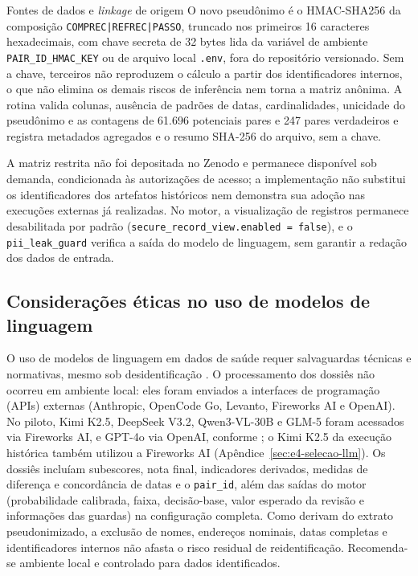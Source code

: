 \begin{chapter}{Fontes de dados e \textit{linkage} de origem}
O novo pseudônimo é o HMAC-SHA256 da composição \texttt{COMPREC|\allowbreak REFREC|\allowbreak PASSO}, truncado nos primeiros 16 caracteres hexadecimais, com chave secreta de 32 bytes lida da variável de ambiente \texttt{PAIR\_\allowbreak ID\_\allowbreak HMAC\_\allowbreak KEY} ou de arquivo local \texttt{.env}, fora do repositório versionado. Sem a chave, terceiros não reproduzem o cálculo a partir dos identificadores internos, o que não elimina os demais riscos de inferência nem torna a matriz anônima. A rotina valida colunas, ausência de padrões de datas, cardinalidades, unicidade do pseudônimo e as contagens de 61.696 potenciais pares e 247 pares verdadeiros e registra metadados agregados e o resumo SHA-256 do arquivo, sem a chave.

A matriz restrita não foi depositada no Zenodo e permanece disponível sob demanda, condicionada às autorizações de acesso; a implementação não substitui os identificadores dos artefatos históricos nem demonstra sua adoção nas execuções externas já realizadas. No motor, a visualização de registros permanece desabilitada por padrão (\texttt{secure\_record\_view.enabled = false}), e o \texttt{pii\_leak\_guard} verifica a saída do modelo de linguagem, sem garantir a redação dos dados de entrada.

\subsection{Considerações éticas no uso de modelos de linguagem}\label{sec:dados-etica}

O uso de modelos de linguagem em dados de saúde requer salvaguardas técnicas e normativas, mesmo sob desidentificação \cite{Vayena2018}. O processamento dos dossiês não ocorreu em ambiente local: eles foram enviados a interfaces de programação (APIs) externas (Anthropic, OpenCode Go, Levanto, Fireworks AI e OpenAI). No piloto, Kimi K2.5, DeepSeek V3.2, Qwen3-VL-30B e GLM-5 foram acessados via Fireworks AI, e GPT-4o via OpenAI, conforme ; o Kimi K2.5 da execução histórica também utilizou a Fireworks AI (Apêndice~\ref{sec:e4-selecao-llm}). Os dossiês incluíam subescores, nota final, indicadores derivados, medidas de diferença e concordância de datas e o \texttt{pair\_id}, além das saídas do motor (probabilidade calibrada, faixa, decisão-base, valor esperado da revisão e informações das guardas) na configuração completa. Como derivam do extrato pseudonimizado, a exclusão de nomes, endereços nominais, datas completas e identificadores internos não afasta o risco residual de reidentificação. Recomenda-se ambiente local e controlado para dados identificados.


\end{chapter}
